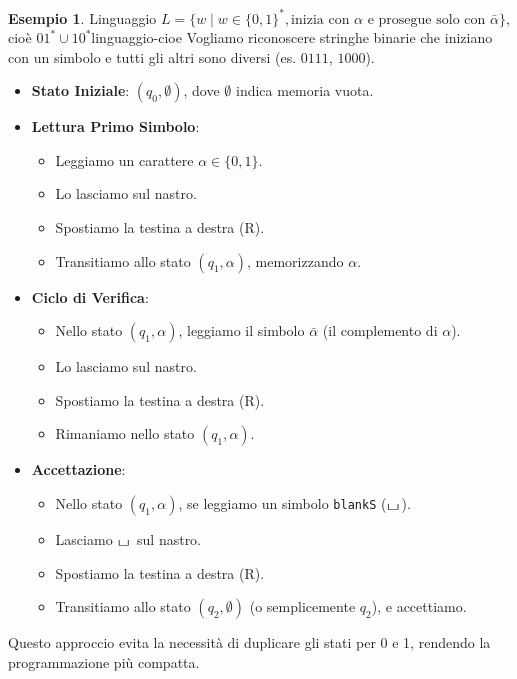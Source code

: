 \documentclass[a4paper]{article}
\theoremstyle{definition} %
\newtheorem{example}{Esempio}
\newcommand{\blankS}{\ensuremath{\raisebox{-0.15ex}{\scalebox{1.3}[0.7]{$\sqcup$}}\mkern2mu}}
\begin{document}
\begin{example}{Linguaggio $L = \{w \mid w \in \{0,1\}^*, \text{inizia con } \alpha \text{ e prosegue solo con } \bar{\alpha} \}$, cioè $01^* \cup 10^*$}{linguaggio-cioe}
Vogliamo riconoscere stringhe binarie che iniziano con un simbolo e tutti gli altri sono diversi (es. $0111$, $1000$).
\begin{itemize}
    \item \textbf{Stato Iniziale}: $(q_0, \emptyset)$, dove $\emptyset$ indica memoria vuota.
    \item \textbf{Lettura Primo Simbolo}:
        \begin{itemize}
            \item Leggiamo un carattere $\alpha \in \{0,1\}$.
            \item Lo lasciamo sul nastro.
            \item Spostiamo la testina a destra (R).
            \item Transitiamo allo stato $(q_1, \alpha)$, memorizzando $\alpha$.
        \end{itemize}
    \item \textbf{Ciclo di Verifica}:
        \begin{itemize}
            \item Nello stato $(q_1, \alpha)$, leggiamo il simbolo $\bar{\alpha}$ (il complemento di $\alpha$).
            \item Lo lasciamo sul nastro.
            \item Spostiamo la testina a destra (R).
            \item Rimaniamo nello stato $(q_1, \alpha)$.
        \end{itemize}
    \item \textbf{Accettazione}:
        \begin{itemize}
            \item Nello stato $(q_1, \alpha)$, se leggiamo un simbolo \texttt{blankS} ($\blankS$).
            \item Lasciamo $\blankS$ sul nastro.
            \item Spostiamo la testina a destra (R).
            \item Transitiamo allo stato $(q_2, \emptyset)$ (o semplicemente $q_2$), e accettiamo.
        \end{itemize}
\end{itemize}
Questo approccio evita la necessità di duplicare gli stati per 0 e 1, rendendo la programmazione più compatta.
\end{example}
\end{document}
